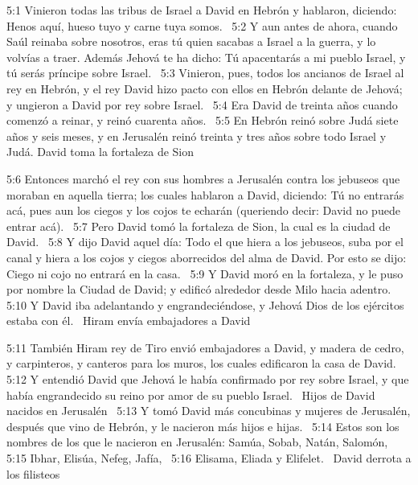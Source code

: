 5:1 Vinieron todas las tribus de Israel a David en Hebrón y hablaron, diciendo: Henos aquí, hueso tuyo y carne tuya somos.  
5:2 Y aun antes de ahora, cuando Saúl reinaba sobre nosotros, eras tú quien sacabas a Israel a la guerra, y lo volvías a traer. Además Jehová te ha dicho: Tú apacentarás a mi pueblo Israel, y tú serás príncipe sobre Israel.  
5:3 Vinieron, pues, todos los ancianos de Israel al rey en Hebrón, y el rey David hizo pacto con ellos en Hebrón delante de Jehová; y ungieron a David por rey sobre Israel.  
5:4 Era David de treinta años cuando comenzó a reinar, y reinó cuarenta años.  
5:5 En Hebrón reinó sobre Judá siete años y seis meses, y en Jerusalén reinó treinta y tres años sobre todo Israel y Judá. 
David toma la fortaleza de Sion  

5:6 Entonces marchó el rey con sus hombres a Jerusalén contra los jebuseos que moraban en aquella tierra; los cuales hablaron a David, diciendo: Tú no entrarás acá, pues aun los ciegos y los cojos te echarán (queriendo decir: David no puede entrar acá).  
5:7 Pero David tomó la fortaleza de Sion, la cual es la ciudad de David.  
5:8 Y dijo David aquel día: Todo el que hiera a los jebuseos, suba por el canal y hiera a los cojos y ciegos aborrecidos del alma de David. Por esto se dijo: Ciego ni cojo no entrará en la casa.  
5:9 Y David moró en la fortaleza, y le puso por nombre la Ciudad de David; y edificó alrededor desde Milo hacia adentro.  
5:10 Y David iba adelantando y engrandeciéndose, y Jehová Dios de los ejércitos estaba con él.  
Hiram envía embajadores a David  

5:11 También Hiram rey de Tiro envió embajadores a David, y madera de cedro, y carpinteros, y canteros para los muros, los cuales edificaron la casa de David.  
5:12 Y entendió David que Jehová le había confirmado por rey sobre Israel, y que había engrandecido su reino por amor de su pueblo Israel.  
Hijos de David nacidos en Jerusalén   
5:13 Y tomó David más concubinas y mujeres de Jerusalén, después que vino de Hebrón, y le nacieron más hijos e hijas.  
5:14 Estos son los nombres de los que le nacieron en Jerusalén: Samúa, Sobab, Natán, Salomón,  
5:15 Ibhar, Elisúa, Nefeg, Jafía,  
5:16 Elisama, Eliada y Elifelet.  
David derrota a los filisteos  

